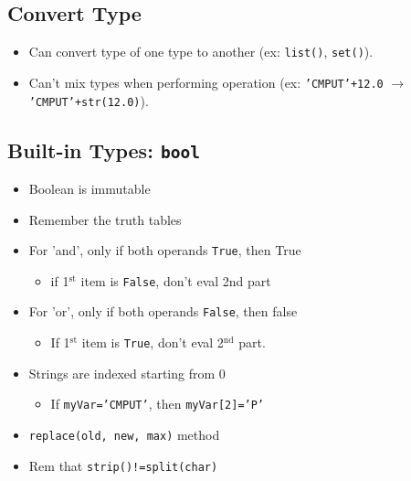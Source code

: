 \documentclass{article}
\begin{document}
\subsection{Convert Type}
    \begin{itemize}
        \item Can convert type of one type to another (ex: \texttt{list()}, \texttt{set()}).
        \item Can't mix types when performing operation (ex: \texttt{'CMPUT'+12.0} $\rightarrow$ \texttt{'CMPUT'+str(12.0)}).
    \end{itemize}

\subsection{Built-in Types: \texttt{bool}}
    \begin{multicols}{2}
        \begin{itemize}
            \item Boolean is immutable
            \item Remember the truth tables
            \item For 'and', only if both operands \texttt{True}, then True
                \begin{itemize}
                    \item if 1$^{\mathrm{st}}$ item is \texttt{False}, don't eval 2nd part
                \end{itemize}
            \item For 'or', only if both operands \texttt{False}, then false
                \begin{itemize}
                    \item If 1$^{\mathrm{st}}$ item is \texttt{True}, don't eval 2$^{\mathrm{nd}}$ part.
                \end{itemize}
            \item Strings are indexed starting from 0
                \begin{itemize}
                    \item If \texttt{myVar='CMPUT'}, then \texttt{myVar[2]='P'}
                \end{itemize}
            \item \texttt{replace(old, new, max)} method
            \item Rem that \texttt{strip()!=split(char)}
        \end{itemize}
    \end{multicols}
    
\end{document}
